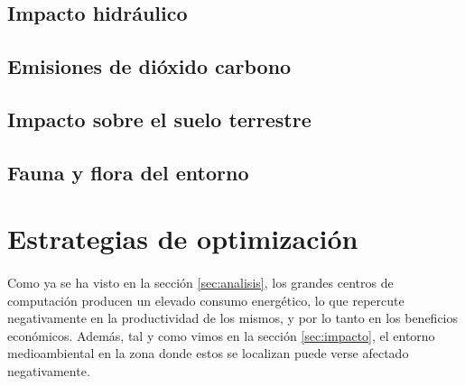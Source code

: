 \documentclass[10pt]{article}
\begin{document}
        \subsection{Impacto hidráulico}
        	\paragraph{}
            
        \subsection{Emisiones de dióxido carbono}
        	\paragraph{}
            
        \subsection{Impacto sobre el suelo terrestre}
        	\paragraph{}
            
        \subsection{Fauna y flora del entorno}
        	\paragraph{}
            
        
            
            

    \section{Estrategias de optimización}
	\label{sec:estrategias}

    	\paragraph{}
		Como ya se ha visto en la sección \ref{sec:analisis}, los grandes centros de computación producen un elevado consumo energético, lo que repercute negativamente en la productividad de los mismos, y por lo tanto en los beneficios económicos. Además, tal y como vimos en la sección \ref{sec:impacto}, el entorno medioambiental en la zona donde estos se localizan puede verse afectado negativamente.
\end{document}
